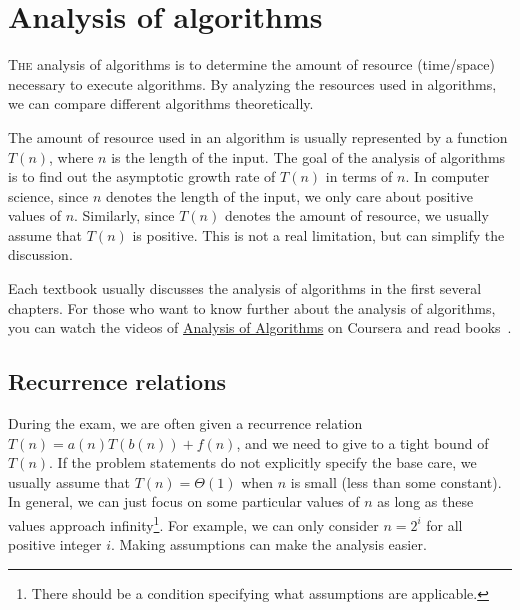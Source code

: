 \chapter{Analysis of algorithms}
\begin{refsection}

\lettrine{T}{he} analysis of algorithms is to determine the amount of resource (time/space) necessary to execute algorithms.
By analyzing the resources used in algorithms, we can compare different algorithms theoretically.

The amount of resource used in an algorithm is usually represented by a function $T(n)$, where $n$ is the length of the input.
The goal of the analysis of algorithms is to find out the asymptotic growth rate of $T(n)$ in terms of $n$.
In computer science, since $n$ denotes the length of the input, we only care about positive values of $n$.
Similarly, since $T(n)$ denotes the amount of resource, we usually assume that $T(n)$ is positive.
This is not a real limitation, but can simplify the discussion.

Each textbook usually discusses the analysis of algorithms in the first several chapters.
For those who want to know further about the analysis of algorithms, you can watch the videos of \href{https://www.coursera.org/course/aofa}{Analysis of Algorithms} on Coursera and read books~\cite{Graham1994,Purdom2004,Sedgewick2013}.

\section{Recurrence relations}
During the exam, we are often given a recurrence relation $T(n) = a(n)T(b(n)) + f(n)$, and we need to give to a tight bound of $T(n)$. If the problem statements do not explicitly specify the base care, we usually assume that $T(n) = \Theta(1)$ when $n$ is small (less than some constant). In general, we can just focus on some particular values of $n$ as long as these values approach infinity\footnote{There should be a condition specifying what assumptions are applicable.}. For example, we can only consider $n = 2^i$ for all positive integer $i$. 
Making assumptions can make the analysis easier.


\end{refsection}
